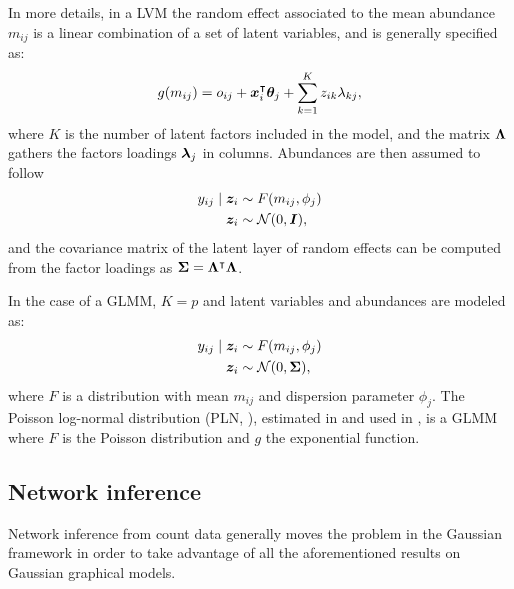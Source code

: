 In more details, in a LVM the random effect associated to the mean abundance $m_{ij}$ is a linear combination of a set of latent variables, and is generally specified as:
 $$g(m_{ij}) = o_{ij}+{\boldsymbol{x}}_i^\intercal  {\boldsymbol{\theta}}_j +\sum_{k=1}^K z_{ik} \lambda_{kj},$$
 where $K$ is the number of latent factors included in the model, and the matrix ${\boldsymbol{\Lambda}}$ gathers the factors loadings ${\boldsymbol{\lambda}}_j$ in columns. Abundances are then assumed to follow
 \begin{align*}
 y_{ij}\mid {\boldsymbol{z}}_i &\sim F(m_{ij}, \phi_j)\\
{\boldsymbol{z}}_i&\sim \mathcal{N}(0, \boldsymbol{I}),
 \end{align*}
and the covariance matrix of the latent layer of random effects can be computed from the factor loadings as ${\boldsymbol{\Sigma}}={\boldsymbol{\Lambda}}^\intercal {\boldsymbol{\Lambda}}$.

In the case of a GLMM, $K=p$ and latent variables and abundances are  modeled as:
 \begin{align*}
 y_{ij}\mid {\boldsymbol{z}}_i &\sim F(m_{ij}, \phi_j)\\
 {\boldsymbol{z}}_i &\sim \mathcal{N}(0, {\boldsymbol{\Sigma}}),
 \end{align*} 
 where $F$ is a distribution with mean $m_{ij}$ and dispersion parameter $\phi_j$. The Poisson log-normal distribution (PLN, \citet{AiH89}), estimated in \citet{CMR18} and used in \citet{MRA20}, is a GLMM where $F$ is the Poisson distribution and $g$ the exponential function.  
 
 \subsection{Network inference}
 Network inference from count data generally moves the problem in the Gaussian framework  in order to  take advantage of all the aforementioned results on Gaussian graphical models. \\
 
